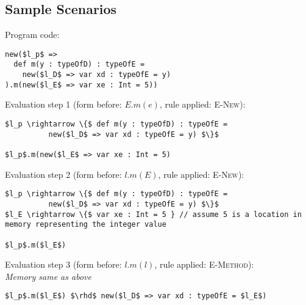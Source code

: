 \documentclass{llncs}
\begin{document}
\newpage

\subsection{Sample Scenarios}

\noindent\underline{}

\vspace{16pt}

\noindent Program code:
\vspace{-6pt}
\begin{lstlisting}[xleftmargin=20pt]
new($l_p$ =>
  def m(y : typeOfD) : typeOfE =
    new($l_D$ => var xd : typeOfE = y)
).m(new($l_E$ => var xe : Int = 5))
\end{lstlisting}

\vspace{12pt}
\noindent Evaluation step 1 (form before: $E.m(e)$, rule applied: \textsc{E-New}):
\vspace{-6pt}
\begin{lstlisting}[xleftmargin=20pt]
$l_p \rightarrow \{$ def m(y : typeOfD) : typeOfE =
          new($l_D$ => var xd : typeOfE = y) $\}$

$l_p$.m(new($l_E$ => var xe : Int = 5)
\end{lstlisting}

\vspace{12pt}
\noindent Evaluation step 2 (form before: $l.m(E)$, rule applied: \textsc{E-New}):
\vspace{-6pt}
\begin{lstlisting}[xleftmargin=20pt]
$l_p \rightarrow \{$ def m(y : typeOfD) : typeOfE =
          new($l_D$ => var xd : typeOfE = y) $\}$
$l_E \rightarrow \{$ var xe : Int = 5 } // assume 5 is a location in memory representing the integer value

$l_p$.m($l_E$)
\end{lstlisting}

\vspace{12pt}
\noindent Evaluation step 3 (form before: $l.m(l)$, rule applied: \textsc{E-Method}):\\
\vspace{-6pt}
\indent\textit{Memory same as above}\\
\vspace{-6pt}
\begin{lstlisting}[xleftmargin=20pt]
$l_p$.m($l_E$) $\rhd$ new($l_D$ => var xd : typeOfE = $l_E$)
\end{lstlisting}
\end{document}
